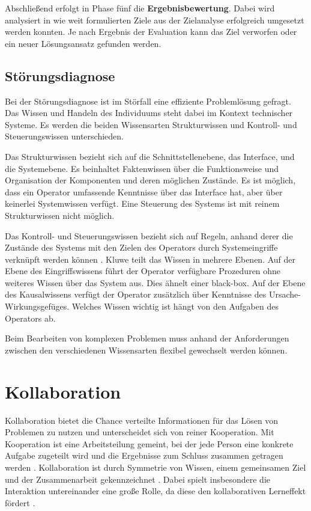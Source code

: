 Abschließend erfolgt in Phase fünf die \textbf{Ergebnisbewertung}. Dabei wird analysiert in wie weit formulierten Ziele aus der Zielanalyse erfolgreich umgesetzt werden konnten. Je nach Ergebnis der Evaluation kann das Ziel verworfen oder ein neuer Lösungsansatz gefunden werden.
\cite{Betsch2011}

\subsection{Störungsdiagnose}
\label{2-Störungsdiagnose}
Bei der Störungsdiagnose ist im Störfall eine effiziente Problemlösung gefragt. Das Wissen und Handeln des Individuums steht dabei im Kontext technischer Systeme. Es werden die beiden Wissensarten Strukturwissen und Kontroll- und Steuerungswissen unterschieden. \cite{Funke2015}

Das Strukturwissen bezieht sich auf die Schnittstellenebene, das Interface, und die Systemebene. Es beinhaltet Faktenwissen über die Funktionsweise und Organisation der Komponenten und deren möglichen Zustände. Es ist möglich, dass ein Operator umfassende Kenntnisse über das Interface hat, aber über keinerlei Systemwissen verfügt. Eine Steuerung des Systems ist mit reinem Strukturwissen nicht möglich. \cite{Funke2015, Kluwe1997}

Das Kontroll- und Steuerungswissen bezieht sich auf Regeln, anhand derer die Zustände des Systems mit den Zielen des Operators durch Systemeingriffe verknüpft werden können \cite{Funke2015}. Kluwe \cite{Kluwe1997} teilt das Wissen in mehrere Ebenen. Auf der Ebene des Eingriffswissens führt der Operator verfügbare Prozeduren ohne weiteres Wissen über das System aus. Dies ähnelt einer black-box. Auf der Ebene des Kausalwissens verfügt der Operator zusätzlich über Kenntnisse des Ursache-Wirkungsgefüges. Welches Wissen wichtig ist hängt von den Aufgaben des Operators ab.

Beim Bearbeiten von komplexen Problemen muss anhand der Anforderungen zwischen den verschiedenen Wissensarten flexibel gewechselt werden können. \cite{Funke2015}

\section{Kollaboration}
Kollaboration bietet die Chance verteilte Informationen für das Lösen von Problemen zu nutzen und unterscheidet sich von reiner Kooperation. Mit Kooperation ist eine Arbeitsteilung gemeint, bei der jede Person eine konkrete Aufgabe zugeteilt wird und die Ergebnisse zum Schluss zusammen getragen werden \cite{Jermann2004}. Kollaboration ist durch Symmetrie von Wissen, einem gemeinsamen Ziel und der Zusammenarbeit gekennzeichnet \cite{Rummel1958}. Dabei spielt insbesondere die Interaktion untereinander eine große Rolle, da diese den kollaborativen Lerneffekt fördert \cite{Jermann2004}.

